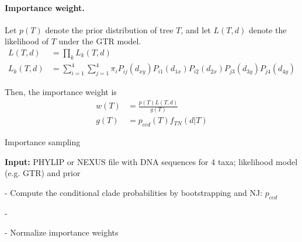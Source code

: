 \documentclass[12pt,letterpaper]{article}
\begin{document}
\paragraph{Importance weight.} Let $p(T)$ denote the prior
distribution of tree $T$, and let $L(T,d)$ denote the likelihood of
$T$ under the GTR model.
\begin{align*}
L(T,d) &= \prod_k L_k(T,d) \\
L_k(T,d) & = \sum_{i=1}^4 \sum_{j=1}^4 \pi_i P_{ij}(d_{xy}) P_{i1}(d_{1x}) P_{i2}(d_{2x}) P_{j3}(d_{3y}) P_{j4}(d_{4y})
\end{align*}

Then, the importance weight is
\begin{align*}
w(T) &= \frac{p(T)L(T,d)}{g(T)} \\
g(T) &= p_{ccd}(T) f_{TN}(d | T)
\end{align*}


\begin{algorithm}
\caption{Importance sampling}
\label{someAlg}

\textbf{Input:} PHYLIP or NEXUS file with DNA sequences for 4 taxa;
likelihood model (e.g. GTR) and prior

- Compute the conditional clade probabilities by bootstrapping and NJ: $p_{ccd}$

- 

- Normalize importance weights







\end{algorithm}
\end{document}
